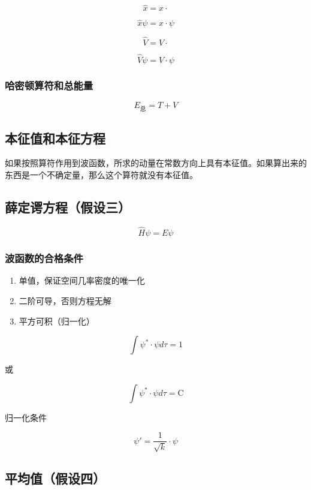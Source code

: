 \documentclass[a4paper]{ctexrep}
\begin{document}
    \[
        \hat{x} = x \cdot  
    \]

    \[
        \hat{x} \psi = x \cdot \psi  
    \]

    \[
        \hat{V} = V \cdot   
    \]

    \[
        \hat{V} \psi = V \cdot \psi  
    \]


    \subsubsection{哈密顿算符和总能量}

    \[
        E_{\mbox{总}} = T + V  
    \]

    \subsection{本征值和本征方程}

    如果按照算符作用到波函数，所求的动量在常数方向上具有本征值。如果算出来的东西是一个不确定量，那么这个算符就没有本征值。

    \subsection{薛定谔方程（假设三）}
    
    \[
        \hat{H} \psi = E \psi  
    \]

    \subsubsection{波函数的合格条件}

    \begin{enumerate}
        \item 单值，保证空间几率密度的唯一化
        \item 二阶可导，否则方程无解
        \item 平方可积（归一化）
    \end{enumerate}

    \[
        \int \psi^{*} \cdot \psi d\tau = 1  
    \]

    或

    \[
        \int \psi^{*} \cdot \psi d\tau = \mathrm{C} 
    \]

    归一化条件

    \[
        \psi' = \frac{1}{\sqrt{k}} \cdot \psi  
    \]

    \subsection{平均值（假设四）}
\end{document}
